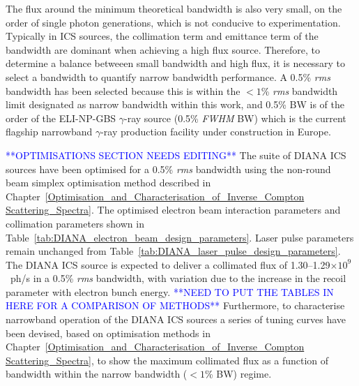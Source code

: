 \documentclass[../main.tex]{subfiles}
\begin{document}
The flux around the minimum theoretical bandwidth is also very small, on the order of single photon generations, which is not conducive to experimentation. Typically in ICS sources, the collimation term and emittance term of the bandwidth are dominant when achieving a high flux source. Therefore, to determine a balance betweeen small bandwidth and high flux, it is necessary to select a bandwidth to quantify narrow bandwidth performance. A 0.5\% \textit{rms} bandwidth has been selected because this is within the $<1$\% \textit{rms} bandwidth limit designated as narrow bandwidth within this work, and 0.5\%  BW is of the order of the ELI-NP-GBS $\gamma$-ray source \cite{elinp2019vega,tanaka2020current} (0.5\% \textit{FWHM} BW) which is the current flagship narrowband $\gamma$-ray production facility under construction in Europe. 

\textcolor{blue}{**OPTIMISATIONS SECTION NEEDS EDITING**}
The suite of DIANA ICS sources have been optimised for a 0.5\% \textit{rms} bandwidth using the non-round beam simplex optimisation method described in Chapter~\ref{Optimisation_and_Characterisation_of_Inverse_Compton Scattering_Spectra}. The optimised electron beam interaction parameters and collimation parameters shown in Table~\ref{tab:DIANA_electron_beam_design_parameters}. Laser pulse parameters remain unchanged from Table~\ref{tab:DIANA_laser_pulse_design_parameters}. The DIANA ICS source is expected to deliver a collimated flux of 1.30--1.29$\times 10^{9}$~ph/\si{\second} in a 0.5\% \textit{rms} bandwidth, with variation due to the increase in the recoil parameter with electron bunch energy. \textcolor{blue}{**NEED TO PUT THE TABLES IN HERE FOR A COMPARISON OF METHODS**} Furthermore, to characterise narrowband operation of the DIANA ICS sources a series of tuning curves have been devised, based on optimisation methods in Chapter~\ref{Optimisation_and_Characterisation_of_Inverse_Compton Scattering_Spectra}, to show the maximum collimated flux as a function of bandwidth within the narrow bandwidth ($<1$\%  BW) regime. 
\end{document}
